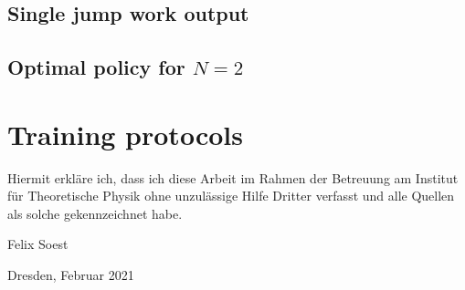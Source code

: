 \section{Single jump work output}


\section{Optimal policy for $N=2$} \label{n2_opt_pol}

\chapter{Training protocols}








\clearpage
\thispagestyle{empty}
\vspace*{1.5em}

Hiermit erkläre ich, dass ich diese Arbeit im Rahmen der Betreuung am Institut
für Theoretische Physik ohne unzulässige Hilfe Dritter verfasst und alle Quellen als solche gekennzeichnet habe.

\vspace*{45em}

Felix Soest \par
Dresden, Februar 2021


